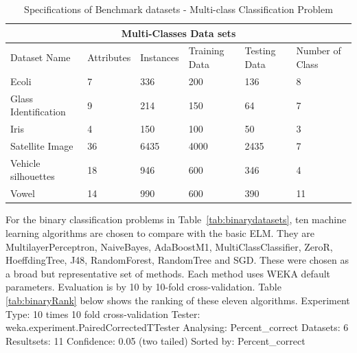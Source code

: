 \documentclass[a4paper, 14pt]{extarticle}
\begin{document}
\begin{table}[H]
\caption{Specifications of Benchmark datasets - Multi-class Classification Problem}
\label{tab:multidatasets}
\centering
\begin{tabular}{ |p{2.8cm}||p{2cm}|p{2cm}|p{2cm}|p{2cm}|p{2cm}|  }
 \hline
 \multicolumn{6}{|c|}{Multi-Classes Data sets} \\
 \hline
 Dataset Name& Attributes & Instances &  Training Data & Testing Data & Number of Class\\
 \hline
 Ecoli   & 7    & 336 & 200  &  136  & 8\\
  \hline
 Glass Identification&   9  &  214  & 150 &  64  & 7\\
  \hline
 Iris & 4 & 150 & 100 &  50  & 3\\
  \hline
 Satellite Image   &36 & 6435 &  4000 &  2435  & 7\\
  \hline
 Vehicle silhouettes & 18  & 946   & 600 &  346 & 4\\
  \hline 
 Vowel & 14  & 990 &  600 &  390  &11\\
  \hline
\end{tabular}
\end{table}
\par For the binary classification problems in Table~\ref{tab:binarydatasets}, ten machine learning algorithms are chosen to compare with the basic ELM. They are MultilayerPerceptron, NaiveBayes, AdaBoostM1, MultiClassClassifier, ZeroR, HoeffdingTree, J48, RandomForest, RandomTree and SGD. These were chosen as a broad but representative set of methods. Each method uses WEKA default parameters. Evaluation is by 10 by 10-fold cross-validation.
Table \ref{tab:binaryRank} below shows the ranking of these eleven algorithms.
\newline\newline
Experiment Type: 10 times 10 fold cross-validation \newline
Tester:     weka.experiment.PairedCorrectedTTester \newline
Analysing:  Percent\_correct \newline
Datasets:   6 \newline
Resultsets: 11 \newline
Confidence: 0.05 (two tailed) \newline
Sorted by:  Percent\_correct
\end{document}
